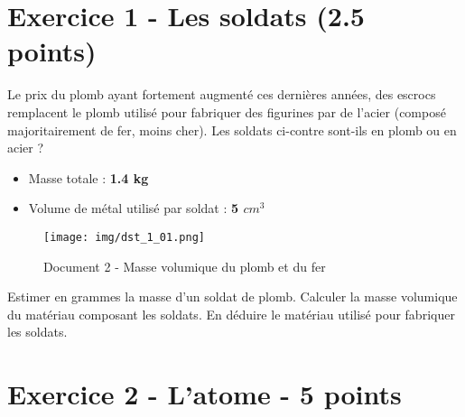 \documentclass{exam}
\begin{document}
\section*{Exercice 1 - Les soldats (2.5 points)}

Le prix du plomb ayant fortement augmenté ces dernières années, des escrocs remplacent le plomb utilisé pour fabriquer des figurines par de l'acier (composé majoritairement de fer, moins cher). Les soldats ci-contre sont-ils en plomb ou en acier ?


\begin{tcolorbox}[colback=gray!10!white, colframe=green!75!black, title=\textcolor{black}{Document 1 - Caractéristiques d'un lot de \textbf{25} soldats de plomb}]
  \begin{itemize}
    \item Masse totale : \textbf{1.4 kg}
    \item Volume de métal utilisé par soldat : \textbf{5 $cm^3$}
  \end{itemize}
\end{tcolorbox}

\begin{figure}[H]
  \centering
  \texttt{[image: img/dst\_1\_01.png]}
  \caption{Document 2 - Masse volumique du plomb et du fer}
\end{figure} 


\begin{questions}
  \question[1] Estimer en grammes la masse d'un soldat de plomb.
  \question[1] Calculer la masse volumique du matériau composant les soldats.
  \question[0.5] En déduire le matériau utilisé pour fabriquer les soldats.
\end{questions}

\section*{Exercice 2 - L'atome - 5 points}
\end{document}
